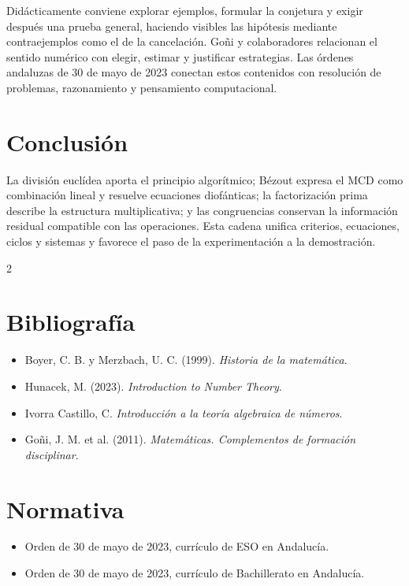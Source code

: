\documentclass[10pt,a4paper]{article}
\begin{document}
Didácticamente conviene explorar ejemplos, formular la conjetura y exigir después una prueba general, haciendo visibles las hipótesis mediante contraejemplos como el de la cancelación. Goñi y colaboradores relacionan el sentido numérico con elegir, estimar y justificar estrategias. Las órdenes andaluzas de 30 de mayo de 2023 conectan estos contenidos con resolución de problemas, razonamiento y pensamiento computacional.

\section{Conclusión}
La división euclídea aporta el principio algorítmico; Bézout expresa el MCD como combinación lineal y resuelve ecuaciones diofánticas; la factorización prima describe la estructura multiplicativa; y las congruencias conservan la información residual compatible con las operaciones. Esta cadena unifica criterios, ecuaciones, ciclos y sistemas y favorece el paso de la experimentación a la demostración.

\begin{multicols}{2}\small
\section*{Bibliografía}
\begin{itemize}
\item Boyer, C. B. y Merzbach, U. C. (1999). \emph{Historia de la matemática}.
\item Hunacek, M. (2023). \emph{Introduction to Number Theory}.
\item Ivorra Castillo, C. \emph{Introducción a la teoría algebraica de números}.
\item Goñi, J. M. et al. (2011). \emph{Matemáticas. Complementos de formación disciplinar}.
\end{itemize}
\columnbreak
\section*{Normativa}
\begin{itemize}
\item Orden de 30 de mayo de 2023, currículo de ESO en Andalucía.
\item Orden de 30 de mayo de 2023, currículo de Bachillerato en Andalucía.
\end{itemize}
\end{multicols}
\end{document}
